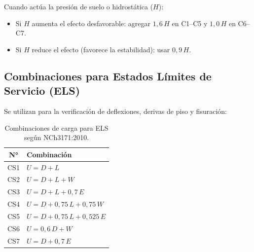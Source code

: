 Cuando actúa la presión de suelo o hidrostática ($H$):
\begin{itemize}
    \item Si $H$ aumenta el efecto desfavorable: agregar $1{,}6\,H$ en C1--C5 y $1{,}0\,H$ en C6--C7.
    \item Si $H$ reduce el efecto (favorece la estabilidad): usar $0{,}9\,H$.
\end{itemize}

\subsection{Combinaciones para Estados Límites de Servicio (ELS)}

Se utilizan para la verificación de deflexiones, derivas de piso y fisuración:

\begin{table}[H]
    \centering
    \caption{Combinaciones de carga para ELS según NCh3171:2010.}
    \label{tab:combinaciones_els}
    \begin{tabular}{cl}
        \hline
        \textbf{N°} & \textbf{Combinación} \\
        \hline
        CS1 & $U = D + L$ \\
        CS2 & $U = D + L + W$ \\
        CS3 & $U = D + L + 0{,}7\,E$ \\
        CS4 & $U = D + 0{,}75\,L + 0{,}75\,W$ \\
        CS5 & $U = D + 0{,}75\,L + 0{,}525\,E$ \\
        CS6 & $U = 0{,}6\,D + W$ \\
        CS7 & $U = D + 0{,}7\,E$ \\
        \hline
    \end{tabular}
\end{table}
